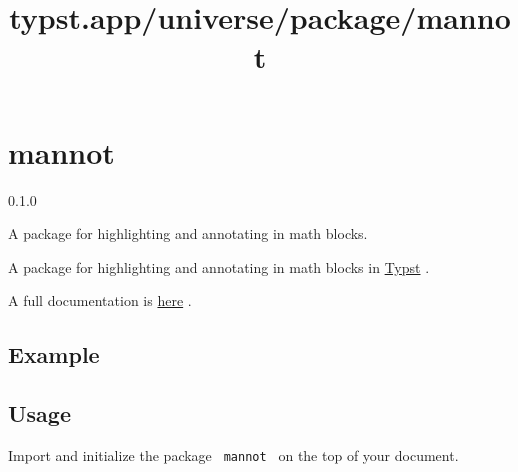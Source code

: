 \title{typst.app/universe/package/mannot}

\label{banner}
\section{mannot}\label{mannot}

{ 0.1.0 }

A package for highlighting and annotating in math blocks.

\label{readme}
A package for highlighting and annotating in math blocks in
\href{https://typst.app/}{Typst} .

A full documentation is
\href{https://github.com/typst/packages/raw/main/packages/preview/mannot/0.1.0/docs/doc.pdf}{here}
.

\subsection{Example}\label{example}

\begin{Shaded}
\begin{Highlighting}[]
\NormalTok{$}

\NormalTok{$}
\end{Highlighting}
\end{Shaded}

\pandocbounded{}

\subsection{Usage}\label{usage}

Import and initialize the package \texttt{\ mannot\ } on the top of your
document.

\begin{Shaded}
\begin{Highlighting}[]
\end{Highlighting}
\end{Shaded}

